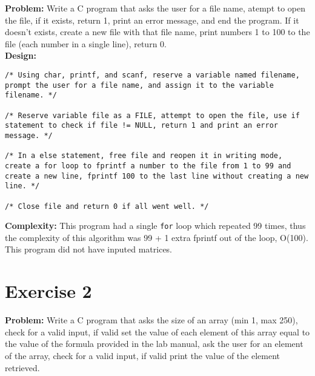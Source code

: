 \documentclass{article}
\begin{document}
\newpage

\textbf{Problem:} Write a C program that asks the user for a file name, atempt to open the file, if it exists, return 1, print an error message, and end the program. If it doesn't exists, create a new file with that file name, print numbers 1 to 100 to the file (each number in a single line), return 0. \\

\textbf{Design:} 
\begin{lstlisting}[numbers=none]
/* Using char, printf, and scanf, reserve a variable named filename, prompt the user for a file name, and assign it to the variable filename. */

/* Reserve variable file as a FILE, attempt to open the file, use if statement to check if file != NULL, return 1 and print an error message. */

/* In a else statement, free file and reopen it in writing mode, create a for loop to fprintf a number to the file from 1 to 99 and create a new line, fprintf 100 to the last line without creating a new line. */

/* Close file and return 0 if all went well. */
\end{lstlisting}
\hfill \break
\textbf{Complexity:} This program had a single \texttt{for} loop which repeated 99 times, thus the complexity of this algorithm was 99 + 1 extra fprintf out of the loop, O(100). This program did not have inputed matrices.


\newpage

\section{Exercise 2}

\textbf{Problem:} Write a C program that asks the size of an array (min 1, max 250), check for a valid input, if valid set the value of each element of this array equal to the value of the formula provided in the lab manual, ask the user for an element of the array, check for a valid input, if valid print the value of the element retrieved. \\
\end{document}
